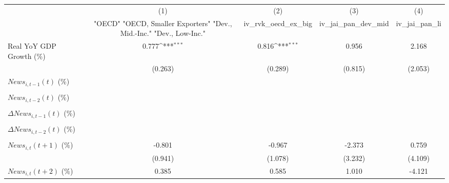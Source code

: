 {
\def\sym#1{\ifmmode^{#1}\else\(^{#1}\)\fi}
\begin{tabular}{l*{4}{c}}
\toprule
                    &\multicolumn{1}{c}{(1)}&\multicolumn{1}{c}{(2)}&\multicolumn{1}{c}{(3)}&\multicolumn{1}{c}{(4)}\\
                    &\multicolumn{1}{c}{ "OECD" "OECD, Smaller Exporters" "Dev., Mid.-Inc." "Dev., Low-Inc."}&\multicolumn{1}{c}{iv_rvk_oecd_ex_big}&\multicolumn{1}{c}{iv_jai_pan_dev_mid}&\multicolumn{1}{c}{iv_jai_pan_li}\\
\midrule
Real YoY GDP Growth (\%)&       0.777\sym{***}&       0.816\sym{***}&       0.956         &       2.168         \\
                    &     (0.263)         &     (0.289)         &     (0.815)         &     (2.053)         \\
\addlinespace
$ News_{i,t-1}(t)$ (\%)&                     &                     &                     &                     \\
                    &                     &                     &                     &                     \\
\addlinespace
$ News_{i,t-2}(t)$ (\%)&                     &                     &                     &                     \\
                    &                     &                     &                     &                     \\
\addlinespace
$ \Delta News_{i,t-1}(t)$ (\%)&                     &                     &                     &                     \\
                    &                     &                     &                     &                     \\
\addlinespace
$ \Delta News_{i,t-2}(t)$ (\%)&                     &                     &                     &                     \\
                    &                     &                     &                     &                     \\
\addlinespace
$ News_{i,t}(t+1)$ (\%)&      -0.801         &      -0.967         &      -2.373         &       0.759         \\
                    &     (0.941)         &     (1.078)         &     (3.232)         &     (4.109)         \\
\addlinespace
$ News_{i,t}(t+2)$ (\%)&       0.385         &       0.585         &       1.010         &      -4.121         \\

\end{tabular}}
